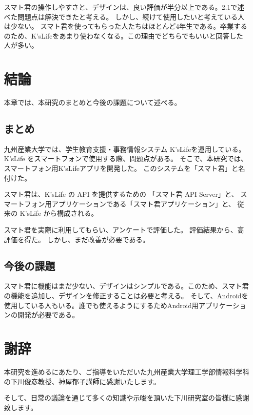 \documentclass[a4j,12pt,onecolumn,oneside,titlepage,openany,final]{jreport}
\begin{document}
スマト君の操作しやすさと、デザインは、良い評価が半分以上である。2.1で述べた問題点は解決できたと考える。
しかし、続けて使用したいと考えている人は少ない。
スマト君を使ってもらった人たちはほとんど4年生である。卒業するのため、K'sLifeをあまり使わなくなる。この理由でどちらでもいいと回答した人が多い。




\chapter{結論}\label{keturon}
本章では、本研究のまとめと今後の課題について述べる。

\section{まとめ}\label{matome}
九州産業大学では、学生教育支援・事務情報システム K'sLifeを運用している。
K'sLife をスマートフォンで使用する際、問題点がある。
そこで、本研究では、スマートフォン用K'sLifeアプリを開発した。
このシステムを「スマト君」と名付けた。

スマト君は、K'sLife の API を提供するための 「スマト君 API Server」と、
スマートフォン用アプリケーションである「スマト君アプリケーション」と、
従来の K'sLife から構成される。

スマト君を実際に利用してもらい、アンケートで評価した。
評価結果から、高評価を得た。
しかし、まだ改善が必要である。
\section{今後の課題}\label{kadai}
スマト君に機能はまだ少ない、デザインはシンプルである。このため、スマト君の機能を追加し、デザインを修正することは必要と考える。
そして、Androidを使用している人もいる。誰でも使えるようにするためAndroid用アプリケーションの開発が必要である。

\chapter*{謝辞}
本研究を進めるにあたり、ご指導をいただいた九州産業大学理工学部情報科学科の下川俊彦教授、神屋郁子講師に感謝いたします。

そして、日常の議論を通じて多くの知識や示唆を頂いた下川研究室の皆様に感謝致します。
\end{document}
